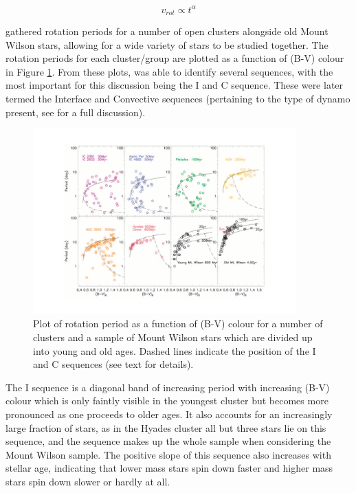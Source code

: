 \begin{equation}
    v_{rot} \propto t^{\alpha}
    \label{Eq:general_rotation_age}
\end{equation}

\citet{Barnes_2003} gathered rotation periods for a number of open clusters alongside old Mount Wilson stars, allowing for a wide variety of stars to be studied together. The rotation periods for each cluster/group are plotted as a function of (B-V) colour in Figure \ref{fig:barnes_2003_plot}. From these plots, \citet{Barnes_2003} was able to identify several sequences, with the most important for this discussion being the I and C sequence. These were later termed the Interface and Convective sequences (pertaining to the type of dynamo present, see \citet{Barnes_2003} for a full discussion).

\begin{figure}
    \centering
    \includegraphics[width=0.9\textwidth]{Figures/2-Historical_overview/barnes_2003.pdf}
    \caption[Rotation period as function of colour for a number of clusters]{Plot of rotation period as a function of (B-V) colour for a number of clusters and a sample of Mount Wilson stars which are divided up into young and old ages. Dashed lines indicate the position of the I and C sequences (see text for details).}
    \label{fig:barnes_2003_plot}
\end{figure}

The I sequence is a diagonal band of increasing period with increasing (B-V) colour which is only faintly visible in the youngest cluster but becomes more pronounced as one proceeds to older ages. It also accounts for an increasingly large fraction of stars, as in the Hyades cluster all but three stars lie on this sequence, and the sequence makes up the whole sample when considering the Mount Wilson sample. The positive slope of this sequence also increases with stellar age, indicating that lower mass stars spin down faster and higher mass stars spin down slower or hardly at all.

